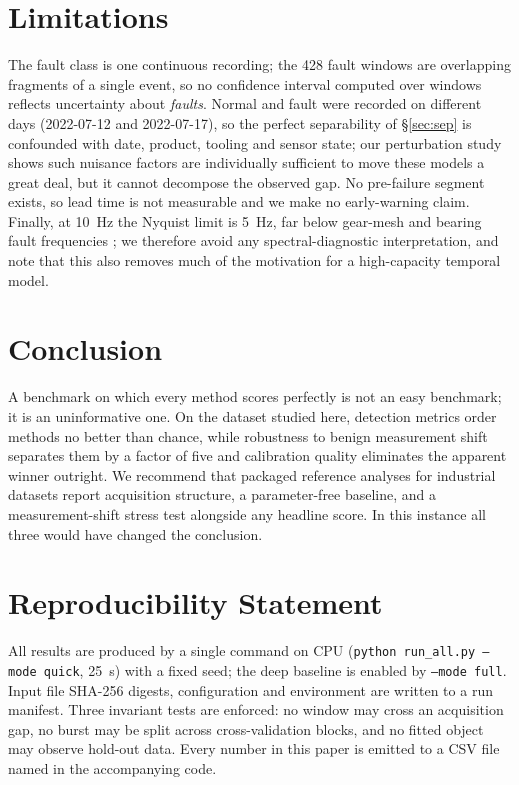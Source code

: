 \documentclass{article}
\begin{document}
\section{Limitations}
\label{sec:limits}

The fault class is one continuous recording; the 428 fault windows are
overlapping fragments of a single event, so no confidence interval computed
over windows reflects uncertainty about \emph{faults}. Normal and fault were
recorded on different days (2022-07-12 and 2022-07-17), so the perfect
separability of \S\ref{sec:sep} is confounded with date, product, tooling and
sensor state; our perturbation study shows such nuisance factors are
individually sufficient to move these models a great deal, but it cannot
decompose the observed gap. No pre-failure segment exists, so lead time is not
measurable and we make no early-warning claim. Finally, at \SI{10}{\hertz} the
Nyquist limit is \SI{5}{\hertz}, far below gear-mesh and bearing fault
frequencies \citep{randall2011rolling}; we therefore avoid any
spectral-diagnostic interpretation, and note that this also removes much of
the motivation for a high-capacity temporal model.

\section{Conclusion}
\label{sec:conclusion}

A benchmark on which every method scores perfectly is not an easy benchmark;
it is an uninformative one. On the dataset studied here, detection metrics
order methods no better than chance, while robustness to benign measurement
shift separates them by a factor of five and calibration quality eliminates
the apparent winner outright. We recommend that packaged reference analyses
for industrial datasets report acquisition structure, a parameter-free
baseline, and a measurement-shift stress test alongside any headline score. In
this instance all three would have changed the conclusion.

\section*{Reproducibility Statement}

All results are produced by a single command on CPU
(\texttt{python run\_all.py --mode quick}, \SI{25}{\second}) with a fixed
seed; the deep baseline is enabled by \texttt{--mode full}. Input file
SHA-256 digests, configuration and environment are written to a run manifest.
Three invariant tests are enforced: no window may cross an acquisition gap, no
burst may be split across cross-validation blocks, and no fitted object may
observe hold-out data. Every number in this paper is emitted to a CSV file
named in the accompanying code.



\end{document}
